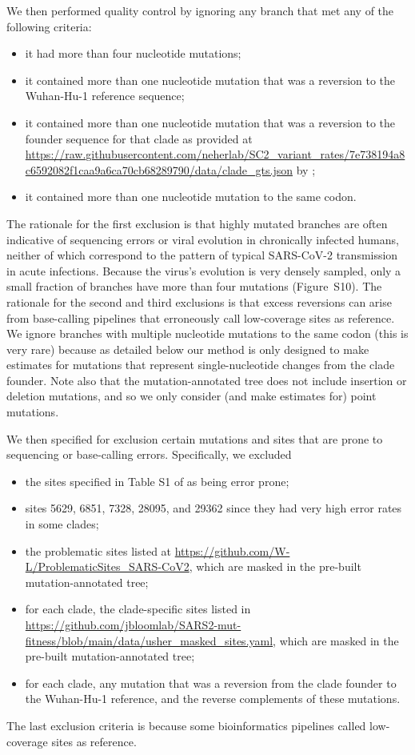 \documentclass[9pt,twocolumn,twoside]{gsajnl_modified}
\begin{document}
{We then performed quality control by ignoring any branch that met any of the following criteria:
\begin{itemize}
\item it had more than four nucleotide mutations;
\item it contained more than one nucleotide mutation that was a reversion to the Wuhan-Hu-1 reference sequence;
\item it contained more than one nucleotide mutation that was a reversion to the founder sequence for that clade as provided at \url{https://raw.githubusercontent.com/neherlab/SC2_variant_rates/7e738194a8c6592082f1caa9a6ca70cb68289790/data/clade_gts.json} by \cite{neher2022contributions};
\item it contained more than one nucleotide mutation to the same codon.
\end{itemize}
The rationale for the first exclusion is that highly mutated branches are often indicative of sequencing errors or viral evolution in chronically infected humans, neither of which correspond to the pattern of typical SARS-CoV-2 transmission in acute infections.
Because the virus's evolution is very densely sampled, only a small fraction of branches have more than four mutations (Figure~S10).
The rationale for the second and third exclusions is that excess reversions can arise from base-calling pipelines that erroneously call low-coverage sites as reference.
We ignore branches with multiple nucleotide mutations to the same codon (this is very rare) because as detailed below our method is only designed to make estimates for mutations that represent single-nucleotide changes from the clade founder.
Note also that the mutation-annotated tree does not include insertion or deletion mutations, and so we only consider (and make estimates for) point mutations.

We then specified for exclusion certain mutations and sites that are prone to sequencing or base-calling errors.
Specifically, we excluded
\begin{itemize}
\item the sites specified in Table S1 of \cite{turakhia2020stability} as being error prone;
\item sites 5629, 6851, 7328, 28095, and 29362 since they had very high error rates in some clades;
\item the problematic sites listed at \url{https://github.com/W-L/ProblematicSites_SARS-CoV2}, which are masked in the pre-built mutation-annotated tree;
\item for each clade, the clade-specific sites listed in \url{https://github.com/jbloomlab/SARS2-mut-fitness/blob/main/data/usher_masked_sites.yaml}, which are masked in the pre-built mutation-annotated tree;
\item for each clade, any mutation that was a reversion from the clade founder to the Wuhan-Hu-1 reference, and the reverse complements of these mutations.
\end{itemize}
The last exclusion criteria is because some bioinformatics pipelines called low-coverage sites as reference.

}
\end{document}

